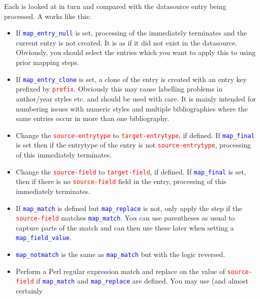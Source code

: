 \documentclass{ltxdockit}
\begin{document}
\noindent Each  is looked at in turn and compared with the
datasource entry being processed. A  works like this:

\begin{itemize}
\item If \textcolor{blue}{\texttt{map\_entry\_null}} is set,
  processing of the  immediately terminates and the current
  entry is not created. It is as if it did not exist in the
  datasource. Obviously, you should select the entries which you want
  to apply this to using prior mapping steps.
\item If \textcolor{blue}{\texttt{map\_entry\_clone}} is set,
  a clone of the entry is created with an entry key prefixed by
  \textcolor{red}{\texttt{prefix}}. Obviously this may cause
  labelling problems in author/year styles etc. and should be used with
  care. It is mainly intended for numbering issues with numeric styles
  and multiple bibliographies where the same entries occur in more than one
  bibliography.
\item Change the \textcolor{red}{\texttt{source-entrytype}} to
  \textcolor{red}{\texttt{target-entrytype}}, if defined. If
  \textcolor{blue}{\texttt{map\_final}} is set then if the entrytype of the
  entry is not \textcolor{red}{\texttt{source-entrytype}}, processing of
  this  immediately terminates.
\item Change the \textcolor{red}{\texttt{source-field}} to
  \textcolor{red}{\texttt{target-field}}, if defined. If
  \textcolor{blue}{\texttt{map\_final}} is set, then if there is no
  \textcolor{red}{\texttt{source-field}} field in the entry, processing of
  this  immediately terminates.
\item If \textcolor{blue}{\texttt{map\_match}} is defined but
  \textcolor{blue}{\texttt{map\_replace}} is not, only apply the
  step if the \textcolor{red}{\texttt{source-field}} matches
  \textcolor{blue}{\texttt{map\_match}}. You can use parentheses as usual
  to capture parts of the match and can then use these later when setting a \textcolor{blue}{\texttt{map\_field\_value}}.
\item \textcolor{blue}{\texttt{map\_notmatch}} is the same as
  \textcolor{blue}{\texttt{map\_match}} but with the logic reversed.
\item Perform a Perl regular expression match and replace on the value of
  \textcolor{red}{\texttt{source-field}} if
  \textcolor{blue}{\texttt{map\_match}} and
  \textcolor{blue}{\texttt{map\_replace}} are defined. You may use (and almost certainly

\end{itemize}
\end{document}
